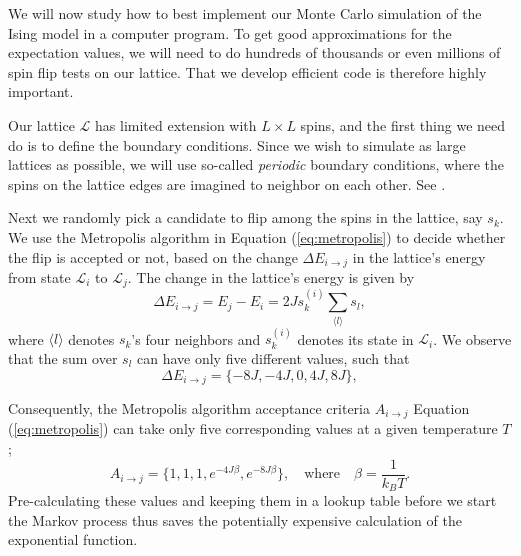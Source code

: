 \documentclass[]{article}
\begin{document}
\vspace{5mm}

We will now study how to best implement our Monte Carlo simulation of the Ising model in a computer program. To get good approximations for the expectation values, we will need to do hundreds of thousands or even millions of spin flip tests on our lattice. That we develop efficient code is therefore highly important.

Our lattice $\mathcal{L}$ has limited extension with $L \times L$ spins, and the first thing we need do is to define the boundary conditions. Since we wish to simulate as large lattices as possible, we will use so-called \textit{periodic} boundary conditions, where the spins on the lattice edges are imagined to neighbor on each other. See \cite{fys-stk4155-notes}.

Next we randomly pick a candidate to flip among the spins in the lattice, say $s_k$. We use the Metropolis algorithm in Equation (\ref{eq:metropolis}) to decide whether the flip is accepted or not, based on the change $\Delta E_{i \rightarrow j}$ in the lattice's energy from state $\mathcal{L}_i$ to $\mathcal{L}_j$. The change in the lattice's energy is given by
\begin{equation} \label{eq:dE}
	\Delta E_{i \rightarrow j} = E_j - E_i = 2J s_k^{(i)} \sum_{\langle l \rangle} s_l,
\end{equation}
where $\langle l \rangle$ denotes $s_k$'s four neighbors and $s_k^{(i)}$ denotes its state in $\mathcal{L}_i$. We observe that the sum over $s_l$ can have only five different values, such that
\begin{equation}
	\Delta E_{i \rightarrow j} = \{-8J, -4J, 0, 4J, 8J \},
\end{equation}

Consequently, the Metropolis algorithm acceptance criteria $A_{i \rightarrow j}$ Equation (\ref{eq:metropolis}) can take only five corresponding values at a given temperature $T$;
\begin{equation} \label{eq:metropolis-acceptance}
	A_{i \rightarrow j} = \{ 1, 1, 1, e^{-4J \beta}, e^{-8J \beta} \}, \quad \text{where} \quad \beta = \frac{1}{k_BT}.
\end{equation}
Pre-calculating these values and keeping them in a lookup table before we start the Markov process thus saves the potentially expensive calculation of the exponential function.
\end{document}
